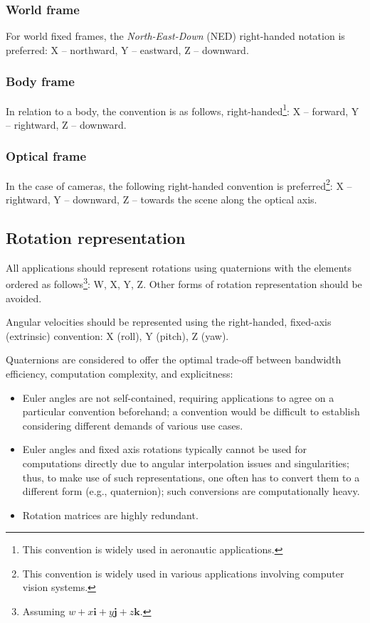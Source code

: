 \subsubsection{World frame}

For world fixed frames, the \emph{North-East-Down} (NED) right-handed notation is preferred:
X -- northward, Y -- eastward, Z -- downward.

\subsubsection{Body frame}

In relation to a body, the convention is as follows, right-handed\footnote{%
    This convention is widely used in aeronautic applications.
}:
X -- forward, Y -- rightward, Z -- downward.

\subsubsection{Optical frame}

In the case of cameras, the following right-handed convention is preferred\footnote{%
    This convention is widely used in various applications involving computer vision systems.
}:
X -- rightward, Y -- downward, Z -- towards the scene along the optical axis.

\subsection{Rotation representation}

All applications should represent rotations using quaternions with the elements ordered as follows\footnote{%
    Assuming $w + x\boldsymbol{i} + y\boldsymbol{j} + z\boldsymbol{k}$.
}: W, X, Y, Z.
Other forms of rotation representation should be avoided.

Angular velocities should be represented using the right-handed, fixed-axis (extrinsic) convention:
X (roll), Y (pitch), Z (yaw).

\begin{remark}
    Quaternions are considered to offer the optimal trade-off between bandwidth efficiency,
    computation complexity, and explicitness:
    \begin{itemize}
        \item Euler angles are not self-contained, requiring applications to agree on a particular
              convention beforehand; a convention would be difficult to establish considering different
              demands of various use cases.

        \item Euler angles and fixed axis rotations typically cannot be used for computations directly
              due to angular interpolation issues and singularities; thus, to make use of such
              representations, one often has to convert them to a different form (e.g., quaternion);
              such conversions are computationally heavy.

        \item Rotation matrices are highly redundant.
    \end{itemize}
\end{remark}

